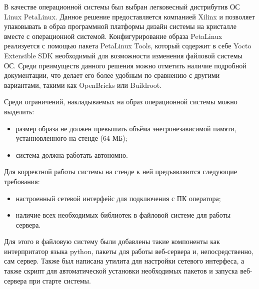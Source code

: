 В качестве операционной системы был выбран легковесный дистрибутив ОС Linux PetaLinux. Данное решение предоставляется компанией Xilinx и позволяет упаковывать в образ программной платформы дизайн системы на кристалле вместе с операционной системой. Конфигурирование образа PetaLinux реализуется с помощью пакета PetaLinux Tools, который содержит в себе Yocto Extensible SDK необходимый для возможности изменения файловой системы ОС. Среди преимуществ данного решения можно отметить наличие подробной документации, что делает его более удобным по сравнению с другими вариантами, такими как OpenBricks или Buildroot.\par
Среди ограничений, накладываемых на образ операционной системы можно выделить:\par
\begin{itemize}
    \item размер образа не должен превышать объёма энегронезависимой памяти, устанновленного на стенде (64 МБ);
    \item система должна работать автономно.
\end{itemize}\par
Для корректной работы системы на стенде к ней предъявляются следующие требования:\par
\begin{itemize}
    \item настроенный сетевой интерфейс для подключения с ПК оператора;
    \item наличие всех необходимых библиотек в файловой системе для работы сервера.
\end{itemize}\par
Для этого в файловую систему были добавлены такие компоненты как интерпритатор языка python, пакеты для работы веб-сервера и, непосредственно, сам сервер. Также был написана утилита для настройки сетевого интерфеса, а также скрипт для автоматической установки необходимых пакетов и запуска веб-сервера при старте системы.
